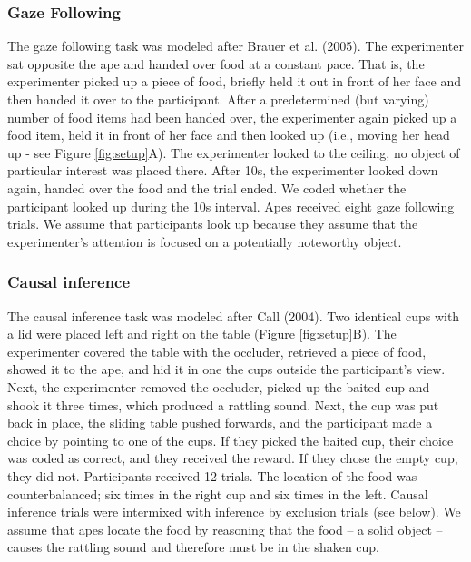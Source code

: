 \documentclass[
  man,floatsintext]{apa6}
\begin{document}
\hypertarget{gaze-following}{%
\subsubsection{Gaze Following}\label{gaze-following}}

The gaze following task was modeled after Brauer et al. (2005). The experimenter sat opposite the ape and handed over food at a constant pace. That is, the experimenter picked up a piece of food, briefly held it out in front of her face and then handed it over to the participant. After a predetermined (but varying) number of food items had been handed over, the experimenter again picked up a food item, held it in front of her face and then looked up (i.e., moving her head up - see Figure \ref{fig:setup}A). The experimenter looked to the ceiling, no object of particular interest was placed there. After 10s, the experimenter looked down again, handed over the food and the trial ended. We coded whether the participant looked up during the 10s interval. Apes received eight gaze following trials. We assume that participants look up because they assume that the experimenter's attention is focused on a potentially noteworthy object.

\hypertarget{causal-inference}{%
\subsubsection{Causal inference}\label{causal-inference}}

The causal inference task was modeled after Call (2004). Two identical cups with a lid were placed left and right on the table (Figure \ref{fig:setup}B). The experimenter covered the table with the occluder, retrieved a piece of food, showed it to the ape, and hid it in one the cups outside the participant's view. Next, the experimenter removed the occluder, picked up the baited cup and shook it three times, which produced a rattling sound. Next, the cup was put back in place, the sliding table pushed forwards, and the participant made a choice by pointing to one of the cups. If they picked the baited cup, their choice was coded as correct, and they received the reward. If they chose the empty cup, they did not. Participants received 12 trials. The location of the food was counterbalanced; six times in the right cup and six times in the left. Causal inference trials were intermixed with inference by exclusion trials (see below). We assume that apes locate the food by reasoning that the food -- a solid object -- causes the rattling sound and therefore must be in the shaken cup.
\end{document}
